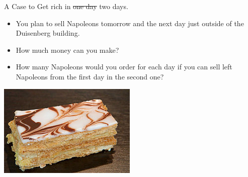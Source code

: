 \begin{exercise} A Case to  Get rich in \st{one day} two days. 

  \begin{itemize}
  \item You plan to sell Napoleons tomorrow and the next day just outside of the Duisenberg building.
  \item How much money can you make? 
  \item How many Napoleons would you order for each day if you can sell left Napoleons from the first day in the second one?
  \end{itemize}

   \includegraphics[scale = 1.0]{figures/mille-feuille}


\end{exercise}
